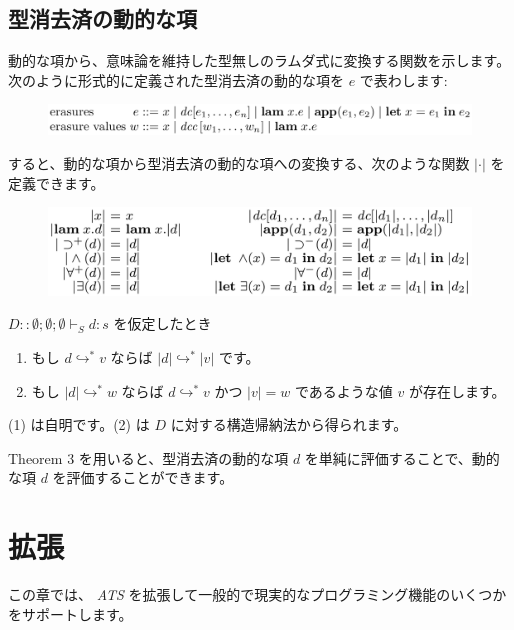 \documentclass[submit,techreq,noauthor,onecolumn]{ipsj}
\begin{document}
\subsection{型消去済の動的な項}

動的な項から、意味論を維持した型無しのラムダ式に変換する関数を示します。
次のように形式的に定義された型消去済の動的な項を $e$ で表わします:

\begin{figure}[h]
\centering
\includegraphics[width=13cm]{img/infig3_erasure.png}
\end{figure}

\noindent すると、動的な項から型消去済の動的な項への変換する、次のような関数 $|\cdot|$ を定義できます。

\begin{figure}[h]
\centering
\includegraphics[width=12cm]{img/infig3_trans_erasure.png}
\end{figure}

$D :: \emptyset; \emptyset; \emptyset \vdash_S d : s$ を仮定したとき

\begin{enumerate}
  \item もし $d \hookrightarrow^* v$ ならば $|d| \hookrightarrow^* |v|$ です。
  \item もし $|d| \hookrightarrow^* w$ ならば $d \hookrightarrow^* v$ かつ $|v| = w$ であるような値 $v$ が存在します。
\end{enumerate}

(1) は自明です。(2) は $D$ に対する構造帰納法から得られます。

\noindent Theorem 3 を用いると、型消去済の動的な項 $d$ を単純に評価することで、動的な項 $d$ を評価することができます。

\section{拡張}

この章では、 {\it ATS} を拡張して一般的で現実的なプログラミング機能のいくつかをサポートします。
\end{document}
